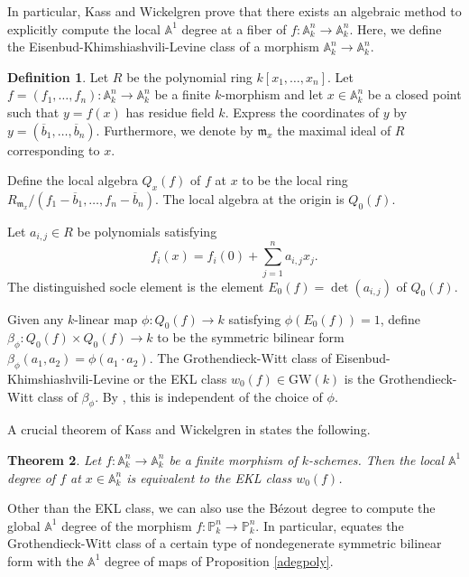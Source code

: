 \documentclass[12pt, reqno]{amsart}
\newtheorem{theorem}{Theorem}[section]
\theoremstyle{definition}
\newtheorem{definition}[theorem]{Definition}
\newcommand{\A}{\mathbb{A}} %
\newcommand{\Proj}{\mathbb{P}} %
\newcommand{\GW}{\mathrm{GW}} %
\begin{document}
In particular, Kass and Wickelgren prove that there exists an algebraic method to explicitly compute the local $\A^1$ degree at a fiber of $f: \A^n_k \to \A^n_k$. Here, we define the Eisenbud-Khimshiashvili-Levine class of a morphism $\A^n_k \rightarrow \A^n_k$.


\begin{definition} \label{def:ekl}
Let $R$ be the polynomial ring $k[x_1,\ldots,x_n]$. Let $f = (f_1,\ldots,f_n): \A^n_k \rightarrow \A^n_k$ be a finite $k$-morphism and let $x \in \A^n_k$ be a closed point such that $y = f(x)$ has residue field $k$. Express the coordinates of $y$ by $y = (\overline{b}_1,\ldots,\overline{b}_n)$. Furthermore, we denote by $\mathfrak{m}_x$ the maximal ideal of $R$ corresponding to $x$.

Define the local algebra $Q_x(f)$ of $f$ at $x$ to be the local ring $R_{\mathfrak{m}_x}/(f_1-\overline{b}_1,\ldots,f_n-\overline{b}_n)$. The local algebra at the origin is $Q_0(f)$. 

Let $a_{i,j} \in R$ be polynomials satisfying
$$
    f_i(x) = f_i(0) + \sum_{j=1}^n a_{i,j} x_j.
$$
The distinguished socle element is the element $E_0(f) = \det(a_{i,j})$ of $Q_0(f)$. 

Given any $k$-linear map $\phi: Q_0(f) \rightarrow k$ satisfying $\phi(E_0(f)) = 1$, define $\beta_\phi: Q_0(f) \times Q_0(f) \rightarrow k$ to be the symmetric bilinear form $\beta_\phi(a_1,a_2) = \phi(a_1 \cdot a_2)$. The Grothendieck-Witt class of Eisenbud-Khimshiashvili-Levine or the EKL class $w_0(f) \in \GW(k)$ is the Grothendieck-Witt class of $\beta_\phi$. By \cite[Lemma 6]{kwEKL}, this is independent of the choice of $\phi$.
\end{definition}

A crucial theorem of Kass and Wickelgren in \cite{kwEKL} states the following.
\begin{theorem}\label{localEKL}\cite[Main Theorem]{kwEKL}
Let $f: \A^n_k \to \A^n_k$ be a finite morphism of $k$-schemes. Then the local $\A^1$ degree of $f$ at $x \in \A^n_k$ is equivalent to the EKL class $w_0(f)$.
\end{theorem}

Other than the EKL class, we can also use the B\'ezout degree to compute the global $\A^1$ degree of the morphism $f: \Proj^n_k \to \Proj^n_k$. In particular, \cite[Lemma 6]{kwBezout} equates the Grothendieck-Witt class of a certain type of nondegenerate symmetric bilinear form with the $\A^1$ degree of maps of Proposition \ref{adegpoly}.
\end{document}
